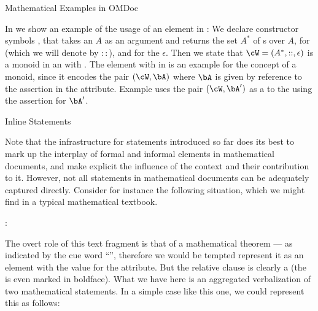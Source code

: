 \begin{omgroup}[short=Mathematical Statements,id=statements]
\begin{omgroup}[id=examples]{Mathematical Examples in OMDoc}
\begin{module}[id=examples]
In {} we show an example of the usage of an {} element
in {\omdoc}: We declare constructor symbols {}, that takes an
{} $A$ as an argument and returns the set $A^*$ of
{s} over $A$, {} for {}
(which we will denote by $::$), and {} for the
{} $\epsilon$.  Then we state that $\cW=(A^*,::,\epsilon)$ is a
monoid in an {} with {}.  The
{} element with {} in {} is
an example for the concept of a monoid, since it encodes the pair $(\cW,\bA)$ where $\bA$
is given by reference to the assertion {} in the
{} attribute.  Example {} uses the pair
$(\cW,\bA')$ as a {} to the {}
{} using the assertion {} for
$\bA'$.
\end{module}
\end{omgroup}

\begin{omgroup}[id=inline-statements]{Inline Statements}
\begin{module}[id=inline-statements]
 
Note that the infrastructure for statements introduced so far does its best to mark up the
interplay of formal and informal elements in mathematical documents, and make explicit the
influence of the context and their contribution to it. However, not all statements in
mathematical documents can be adequately captured directly.  Consider for instance the
following situation, which we might find in a typical mathematical textbook.
\begin{sblockquote}
  {}: {}
\end{sblockquote}
The overt role of this text fragment is that of a mathematical theorem --- as indicated by
the cue word ``{}'', therefore we would be tempted represent it as an
{} element with the value {} for the
{} attribute. But the relative clause is clearly a
{} (the {} is even marked in boldface). What we
have here is an aggregated verbalization of two mathematical statements. In a simple case
like this one, we could represent this as follows:


\end{module}
\end{omgroup}
\end{omgroup}
